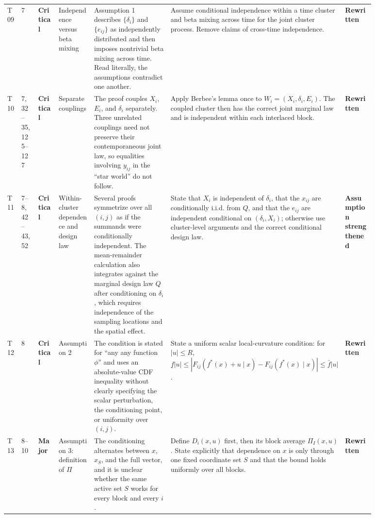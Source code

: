 \documentclass[11pt]{article}
\newcommand{\status}[1]{\textcolor{implgreen}{\textbf{#1}}}
\begin{document}
\begin{landscape}
\begin{longtable}{L{0.04\linewidth}L{0.055\linewidth}L{0.065\linewidth}L{0.11\linewidth}L{0.245\linewidth}L{0.275\linewidth}L{0.095\linewidth}}
T09 & 7 & \textcolor{crit}{\textbf{Critical}} & Independence versus beta mixing & Assumption 1 describes $\{\delta_i\}$ and $\{e_{ij}\}$ as independently distributed and then imposes nontrivial beta mixing across time. Read literally, the assumptions contradict one another. & Assume conditional independence within a time cluster and beta mixing across time for the joint cluster process. Remove claims of cross-time independence. & \status{Rewritten}\\
T10 & 7, 32--35, 125--127 & \textcolor{crit}{\textbf{Critical}} & Separate couplings & The proof couples $X_i$, $E_i$, and $\delta_i$ separately. Three unrelated couplings need not preserve their contemporaneous joint law, so equalities involving $y_{ij}$ in the “star world” do not follow. & Apply Berbee’s lemma once to $W_i=(X_i,\delta_i,E_i)$. The coupled cluster then has the correct joint marginal law and is independent within each interlaced block. & \status{Rewritten}\\
T11 & 7--8, 42--43, 52 & \textcolor{crit}{\textbf{Critical}} & Within-cluster dependence and design law & Several proofs symmetrize over all $(i,j)$ as if the summands were conditionally independent. The mean-remainder calculation also integrates against the marginal design law $Q$ after conditioning on $\delta_i$, which requires independence of the sampling locations and the spatial effect. & State that $X_i$ is independent of $\delta_i$, that the $x_{ij}$ are conditionally i.i.d. from $Q$, and that the $e_{ij}$ are independent conditional on $(\delta_i,X_i)$; otherwise use cluster-level arguments and the correct conditional design law. & \status{Assumption strengthened}\\
T12 & 8 & \textcolor{crit}{\textbf{Critical}} & Assumption 2 & The condition is stated for “any any function $\phi$” and uses an absolute-value CDF inequality without clearly specifying the scalar perturbation, the conditioning point, or uniformity over $(i,j)$. & State a uniform scalar local-curvature condition: for $|u|\le R$, $\underline f|u|\le|F_{ij}(f^*(x)+u\mid x)-F_{ij}(f^*(x)\mid x)|\le\bar f|u|$. & \status{Rewritten}\\
T13 & 8--10 & \textcolor{major}{\textbf{Major}} & Assumption 3: definition of $\Pi$ & The conditioning alternates between $x$, $x_S$, and the full vector, and it is unclear whether the same active set $S$ works for every block and every $i$. & Define $D_i(x,u)$ first, then its block average $\Pi_I(x,u)$. State explicitly that dependence on $x$ is only through one fixed coordinate set $S$ and that the bound holds uniformly over all blocks. & \status{Rewritten}\\

\end{longtable}
\end{landscape}
\end{document}
